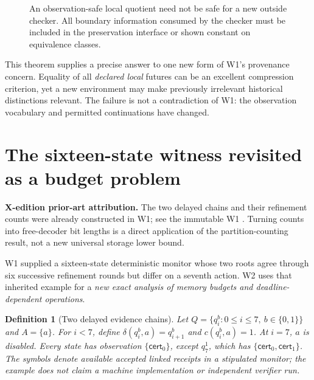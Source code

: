 \documentclass[11pt,letterpaper]{article}
\newcommand{\PriorArtNote}[1]{%
\par\smallskip\noindent\begin{minipage}{\linewidth}\small\color{black!85}%
\textbf{X-edition prior-art attribution.} #1\end{minipage}\par\smallskip}
\newtheorem{definition}[theorem]{Definition}
\newcommand{\cert}{\mathsf{cert}}
\begin{document}
\begin{figure}[htbp]\centering
{}
\caption{An observation-safe local quotient need not be safe for a new outside checker. All boundary information consumed by the checker must be included in the preservation interface or shown constant on equivalence classes.}\label{fig:context}
\end{figure}

This theorem supplies a precise answer to one new form of W1's provenance concern. Equality of all \emph{declared local} futures can be an excellent compression criterion, yet a new environment may make previously irrelevant historical distinctions relevant. The failure is not a contradiction of W1: the observation vocabulary and permitted continuations have changed.

\section{The sixteen-state witness revisited as a budget problem}
\PriorArtNote{The two delayed chains and their refinement counts were already constructed in W1; see the immutable W1 \cite{tennesonW1}. Turning counts into free-decoder bit lengths is a direct application of the partition-counting result, not a new universal storage lower bound.}\label{sec:example}
W1 supplied a sixteen-state deterministic monitor whose two roots agree through six successive refinement rounds but differ on a seventh action. W2 uses that inherited example for a \emph{new exact analysis of memory budgets and deadline-dependent operations}.

\begin{definition}[Two delayed evidence chains]\label{def:chains}
Let $Q=\{q_i^b:0\le i\le7,\ b\in\{0,1\}\}$ and $A=\{a\}$. For $i<7$, define $\delta(q_i^b,a)=q_{i+1}^b$ and $c(q_i^b,a)=1$. At $i=7$, $a$ is disabled. Every state has observation $\{\cert_0\}$, except $q_7^1$, which has $\{\cert_0,\cert_1\}$. The symbols denote available accepted linked receipts in a \emph{stipulated} monitor; the example does not claim a machine implementation or independent verifier run.
\end{definition}
\end{document}

